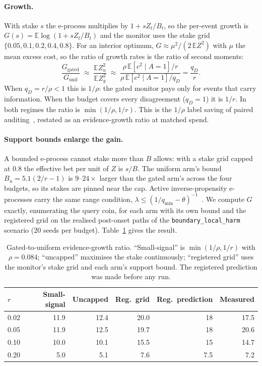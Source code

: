 \paragraph{Growth.}
With stake $s$ the e-process multiplies by $1+sZ_t/B_t$, so the per-event growth is
$G(s)=\mathbb E\log(1+sZ_t/B_t)$ and the monitor uses the stake grid $\{0.05,0.1,0.2,0.4,0.8\}$.
For an interior optimum, $G\approx\mu^2/(2\,\mathbb E Z^2)$ with $\mu$ the mean excess cost, so the ratio of growth rates is
the ratio of second moments:
\[
\frac{G_{\mathrm{gated}}}{G_{\mathrm{unif}}}\;\approx\;\frac{\mathbb E Z_u^2}{\mathbb E Z_g^2}\;\approx\;
\frac{\rho\,\mathbb E[c^2\mid A{=}1]/r}{\rho\,\mathbb E[c^2\mid A{=}1]/q_D}=\frac{q_D}{r}.
\]
When $q_D=r/\rho<1$ this is $1/\rho$: the gated monitor pays only for events that carry information.
When the budget covers every disagreement ($q_D=1$) it is $1/r$. In both regimes the ratio is
$\min(1/\rho,1/r)$. This is the $1/\rho$ label saving of paired auditing~\citep{discern}, restated as an evidence-growth ratio at matched spend.

\paragraph{Support bounds enlarge the gain.}
A bounded e-process cannot stake more than $B$ allows: with a stake grid capped at $0.8$ the effective bet per unit of $Z$ is $s/B$.
The uniform arm's bound $B_u=5.1(2/r-1)$ is $9$--$24\times$ larger than the gated arm's across the four budgets, so its stakes are
pinned near the cap. Active inverse-propensity e-processes carry the same range condition, $\lambda\le(1/q_{\min}-\theta)^{-1}$~\citep{xu2024active}.
We compute $G$ exactly, enumerating the query coin, for each arm with its own bound and the registered grid on the realised post-onset
paths of the \texttt{boundary\_local\_harm} scenario (20 seeds per budget). Table~\ref{tab:prediction} gives the result.

\begin{table}[t]
\centering\small
\caption{Gated-to-uniform evidence-growth ratio. ``Small-signal'' is $\min(1/\rho,1/r)$ with $\rho=0.084$;
``uncapped'' maximises the stake continuously; ``registered grid'' uses the monitor's stake grid and each arm's support bound.
The registered prediction was made before any run.}
\label{tab:prediction}
\begin{tabular}{lrrrrr}
\toprule
$r$ & Small-signal & Uncapped & Reg.\ grid & Reg.\ prediction & Measured \\
\midrule
0.02 & 11.9 & 12.4 & 20.0 & 18   & 17.5 \\
0.05 & 11.9 & 12.5 & 19.7 & 18   & 20.6 \\
0.10 & 10.0 & 10.1 & 15.5 & 15   & 14.7 \\
0.20 & 5.0  & 5.1  & 7.6  & 7.5  & 7.2  \\
\bottomrule
\end{tabular}
\end{table}

